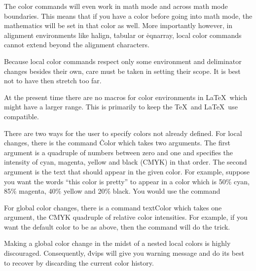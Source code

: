 The color commands will even work in math mode and across math mode
boundaries.  This means that if you have a color before going into
math mode, the mathematics will be set in that color as well.  More
importantly however, in alignment environments like \.{\ttbackslash
halign}, \.{tabular} or \.{eqnarray}, local color commands cannot
extend beyond the alignment characters.
 
Because local color commands respect only some environment and
deliminator changes besides their own, care must be taken in setting
their scope.  It is best not to have then stretch too far.
 
At the present time there are no macros for color environments in
La\TeX\ which might have a larger range.  This is primarily to keep
the \TeX\ and La\TeX\ use compatible. 

 
There are two ways for the user to specify colors not already defined.
For local changes, there is the command \.{\ttbackslash Color} which
takes two arguments.  The first argument is a quadruple of numbers
between zero and one and specifies the intensity of cyan, magenta,
yellow and black (CMYK) in that order.  The second argument is the
text that should appear in the given color.  For example, suppose you
want the words ``this color is pretty'' to appear in a color which is
50\% cyan, 85\% magenta, 40\% yellow and 20\% black.  You would use
the command

For global color changes, there is a command \.{\ttbackslash
textColor} which takes one argument, the CMYK quadruple of relative
color intensities.  For example, if you want the default color to be
as above, then the command
\noindent
will do the trick.
 
Making a global color change in the midst of a nested local colors is
highly discouraged.  Consequently, \.{dvips} will give you warning
message and do its best to recover by discarding the current color
history.


